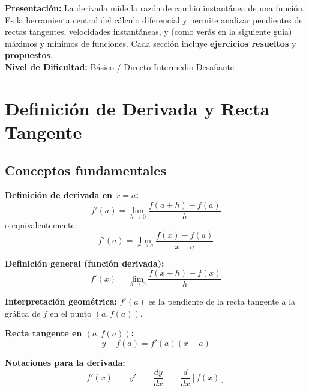 \documentclass[12pt, a4paper]{article}
\begin{document}


\vspace{4pt}
\begin{cuadroinfo}
  \small
  \textbf{Presentación:} La derivada mide la razón de cambio instantánea de una función. Es la herramienta central del cálculo diferencial y permite analizar pendientes de rectas tangentes, velocidades instantáneas, y (como verás en la siguiente guía) máximos y mínimos de funciones. Cada sección incluye \textbf{ejercicios resueltos} y \textbf{propuestos}.
  \\[4pt]
  \textbf{Nivel de Dificultad:}\quad
  \facil{} Básico / Directo \quad
  \medio{} Intermedio \quad
  \dificil{} Desafiante
\end{cuadroinfo}

\vspace{8pt}

\section{Definición de Derivada y Recta Tangente}

\subsection{Conceptos fundamentales}

\begin{cuadroteoria}
  \textbf{Definición de derivada en $x = a$:}
  $$f'(a) = \lim_{h \to 0} \frac{f(a + h) - f(a)}{h}$$
  o equivalentemente:
  $$f'(a) = \lim_{x \to a} \frac{f(x) - f(a)}{x - a}$$

  \textbf{Definición general (función derivada):}
  $$f'(x) = \lim_{h \to 0} \frac{f(x + h) - f(x)}{h}$$

  \textbf{Interpretación geométrica:} $f'(a)$ es la pendiente de la recta tangente a la gráfica de $f$ en el punto $(a, f(a))$.
\end{cuadroteoria}

\newpage

\begin{cuadrosolucion}
  \textbf{Recta tangente en $(a, f(a))$:}
  $$y - f(a) = f'(a)(x - a)$$

  \textbf{Notaciones para la derivada:}
  $$f'(x) \qquad y' \qquad \frac{dy}{dx} \qquad \frac{d}{dx}[f(x)]$$
\end{cuadrosolucion}
\end{document}

